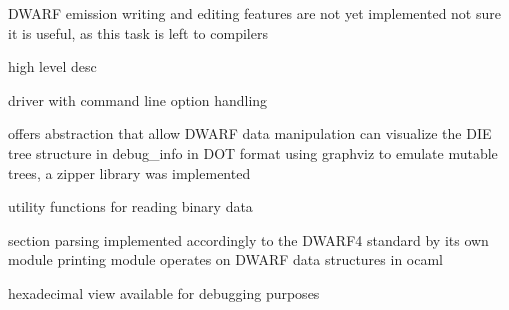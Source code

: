 DWARF emission writing and editing features are not yet implemented
not sure it is useful, as this task is left to compilers

high level desc


driver with command line option handling

offers abstraction that allow DWARF data manipulation
can visualize the DIE tree structure in debug\_info in DOT format using graphviz
to emulate mutable trees, a zipper library was implemented

utility functions for reading binary data

section parsing implemented accordingly to the DWARF4 standard by its own module
printing module operates on DWARF data structures in ocaml

hexadecimal view available for debugging purposes

